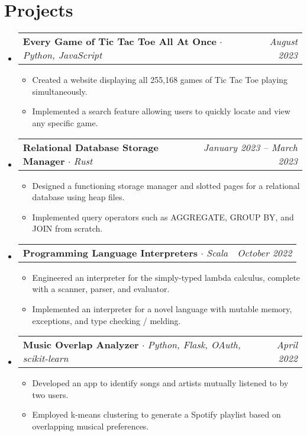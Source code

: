 \documentclass[letterpaper,11pt]{article}
\makeatletter
\newcommand{\resumeItem}[1]{
  \item\small{
    {#1 \vspace{-2pt}}
  }
}
\newcommand{\resumeProjectHeading}[2]{
    \item
    \begin{tabular*}{0.97\textwidth}{l@{\extracolsep{\fill}}r}
      \small#1 & #2 \\
    \end{tabular*}\vspace{-7pt}
}
\newcommand{\resumeSubHeadingListStart}{\begin{itemize}[leftmargin=0.125in, label={}]}
\newcommand{\resumeSubHeadingListEnd}{\end{itemize}}
\newcommand{\resumeItemListStart}{\begin{itemize}[leftmargin=0.185in]
}
\newcommand{\resumeItemListEnd}{\end{itemize}\vspace{-5pt}}
\makeatother
\begin{document}
\section{Projects}

\resumeSubHeadingListStart

    \resumeProjectHeading
          {\textbf{Every Game of Tic Tac Toe All At Once} $\cdot$ \emph{Python, JavaScript}}{\emph{August 2023}}
    \resumeItemListStart
    \resumeItem {
        Created a website displaying all 255,168 games of Tic Tac Toe playing simultaneously.
    }
    \resumeItem {
        Implemented a search feature allowing users to quickly locate and view any specific game.
    }
      
    \resumeItemListEnd
    
      
      \resumeProjectHeading
          {\textbf{Relational Database Storage Manager} $\cdot$ \emph{Rust}}{\emph{January 2023 -- March 2023}}
          \resumeItemListStart
             \resumeItem{Designed a functioning storage manager and slotted pages for a relational database using heap files.}
        \resumeItem{Implemented query operators such as AGGREGATE, GROUP BY, and JOIN from scratch.}
          \resumeItemListEnd


  \resumeProjectHeading
          {\textbf{Programming Language Interpreters} $\cdot$ \emph{Scala}}{\emph{October 2022}}
    \resumeItemListStart
    \resumeItem{Engineered an interpreter for the simply-typed lambda calculus, complete with a scanner, parser, and evaluator.}
      \resumeItem{Implemented an interpreter for a novel language with mutable memory, exceptions, and type checking / melding.}
    \resumeItemListEnd


    \resumeProjectHeading
          {\textbf{Music Overlap Analyzer} $\cdot$ \emph{Python, Flask, OAuth, scikit-learn}}{\emph{April 2022}}
          \resumeItemListStart
             \resumeItem{Developed an app to identify songs and artists mutually listened to by two users.}
            \resumeItem{Employed k-means clustering to generate a Spotify playlist based on overlapping musical preferences.}
          \resumeItemListEnd
\resumeSubHeadingListEnd
  
\end{document}
